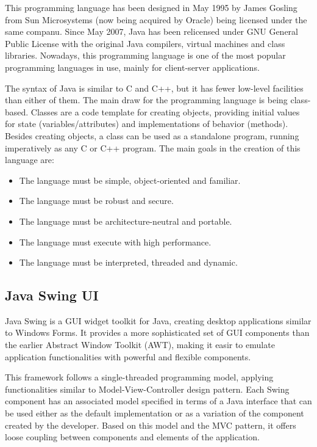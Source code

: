 \documentclass[12pt,a4paper,twoside]{report}
\begin{document}
This programming language has been designed in May 1995 by James Gosling from Sun Microsystems (now being acquired by Oracle) being licensed under the same companu. Since May 2007, Java has been relicensed under GNU General Public License with the original Java compilers, virtual machines and class libraries. Nowadays, this programming language is one of the most popular programming languages in use, mainly for client-server applications. 

The syntax of Java is similar to C and C++, but it has fewer low-level facilities than either of them. The main draw for the programming language is being class-based. Classes are a code template for creating objects, providing initial values for state (variables/attributes) and implementations of behavior (methods). Besides creating objects, a class can be used as a standalone program, running imperatively as any C or C++ program. The main goals in the creation of this language are:
\begin{itemize}
 \item The language must be simple, object-oriented and familiar.
 \item The language must be robust and secure.
 \item The language must be architecture-neutral and portable.
 \item The language must execute with high performance.
 \item The language must be interpreted, threaded and dynamic.
\end{itemize}


\subsection{Java Swing UI}

Java Swing is a GUI widget toolkit for Java, creating desktop applications similar to Windows Forms. It provides a more sophisticated set of GUI components than the earlier Abstract Window Toolkit (AWT), making it easir to emulate application functionalities with powerful and flexible components. 

This framework follows a single-threaded programming model, applying functionalities similar to Model-View-Controller design pattern. Each Swing component has an associated model specified in terms of a Java interface that can be used either as the default implementation or as a variation of the component created by the developer. Based on this model and the MVC pattern, it offers loose coupling between components and elements of the application.
\end{document}
